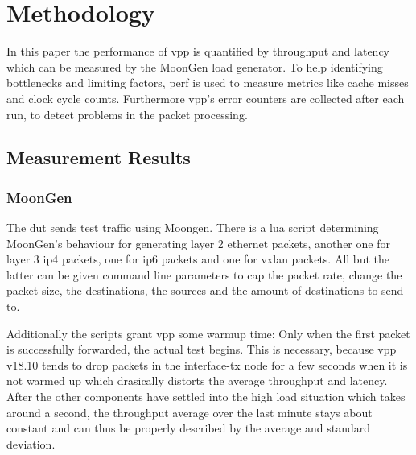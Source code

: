 
\section{Methodology}
\label{sec:methodology}






In this paper the performance of \Ac{vpp} is quantified by throughput
and latency which can be measured by the MoonGen
\cite{emmerich2015moongen} load generator. To help identifying
bottlenecks and limiting factors, \Ac{perf} is used to measure metrics
like cache misses and clock cycle counts. Furthermore \Ac{vpp}'s error
counters are collected after each run, to detect problems in the
packet processing.


\subsection{Measurement Results}



\subsubsection{MoonGen} 


The \Ac{dut} sends test traffic using Moongen. There is a lua script
determining MoonGen's behaviour for generating layer 2 ethernet
packets, another one for layer 3 \Ac{ip4} packets, one for \Ac{ip6}
packets and one for \Ac{vxlan} packets. All but the latter can be
given command line parameters to cap the packet rate, change the
packet size, the destinations, the sources and the amount of
destinations to send to.

Additionally the scripts grant \Ac{vpp} some warmup time: Only when
the first packet is successfully forwarded, the actual test begins.
This is necessary, because \Ac{vpp} v18.10 tends to drop packets in
the interface-tx node for a few seconds when it is not warmed up which
drasically distorts the average throughput and latency. After the
other components have settled into the high load situation which takes
around a second, the throughput average over the last minute stays
about constant and can thus be properly described by the average and
standard deviation.

